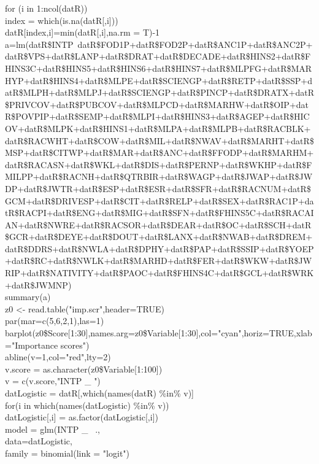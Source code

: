\documentclass[12pt]{article}
\begin{document}
for (i in 1:ncol(datR)) {\\
  index = which(is.na(datR[,i]))\\
  datR[index,i]=min(datR[,i],na.rm = T)-1\\
}
a=lm(datR\$INTP~datR\$FOD1P+datR\$FOD2P+datR\$ANC1P+datR\$ANC2P+datR\$VPS+datR\$LANP+datR\$DRAT+datR\$DECADE+datR\$HINS2+datR\$FHINS3C+datR\$HINS5+datR\$HINS6+datR\$HINS7+datR\$MLPFG+datR\$MARHYP+datR\$HINS4+datR\$MLPE+datR\$SCIENGP+datR\$RETP+datR\$SSP+datR\$MLPH+datR\$MLPJ+datR\$SCIENGP+datR\$PINCP+datR\$DRATX+datR\$PRIVCOV+datR\$PUBCOV+datR\$MLPCD+datR\$MARHW+datR\$OIP+datR\$POVPIP+datR\$SEMP+datR\$MLPI+datR\$HINS3+datR\$AGEP+datR\$HICOV+datR\$MLPK+datR\$HINS1+datR\$MLPA+datR\$MLPB+datR\$RACBLK+datR\$RACWHT+datR\$COW+datR\$MIL+datR\$NWAV+datR\$MARHT+datR\$MSP+datR\$CITWP+datR\$MAR+datR\$ANC+datR\$FFODP+datR\$MARHM+datR\$RACASN+datR\$WKL+datR\$DIS+datR\$PERNP+datR\$WKHP+datR\$FMILPP+datR\$RACNH+datR\$QTRBIR+datR\$WAGP+datR\$JWAP+datR\$JWDP+datR\$JWTR+datR\$ESP+datR\$ESR+datR\$SFR+datR\$RACNUM+datR\$GCM+datR\$DRIVESP+datR\$CIT+datR\$RELP+datR\$SEX+datR\$RAC1P+datR\$RACPI+datR\$ENG+datR\$MIG+datR\$SFN+datR\$FHINS5C+datR\$RACAIAN+datR\$NWRE+datR\$RACSOR+datR\$DEAR+datR\$OC+datR\$SCH+datR\$GCR+datR\$DEYE+datR\$DOUT+datR\$LANX+datR\$NWAB+datR\$DREM+datR\$DDRS+datR\$NWLA+datR\$DPHY+datR\$PAP+datR\$SSIP+datR\$YOEP+datR\$RC+datR\$NWLK+datR\$MARHD+datR\$FER+datR\$WKW+datR\$JWRIP+datR\$NATIVITY+datR\$PAOC+datR\$FHINS4C+datR\$GCL+datR\$WRK+datR\$JWMNP)\\
summary(a)\\
z0 <- read.table("imp.scr",header=TRUE) \\
par(mar=c(5,6,2,1),las=1) \\
barplot(z0\$Score[1:30],names.arg=z0\$Variable[1:30],col="cyan",horiz=TRUE,xlab="Importance scores") \\
abline(v=1,col="red",lty=2)\\
v.score = as.character(z0\$Variable[1:100])\\
v = c(v.score,"INTP \_ ")\\
datLogistic = datR[,which(names(datR) \%in\% v)]\\
for(i in which(names(datLogistic) \%in\% v)){\\
  datLogistic[,i] = as.factor(datLogistic[,i])\\
}
model = glm(INTP \_  ~.,\\
            data=datLogistic,\\
            family = binomial(link = "logit")\\
\end{document}
